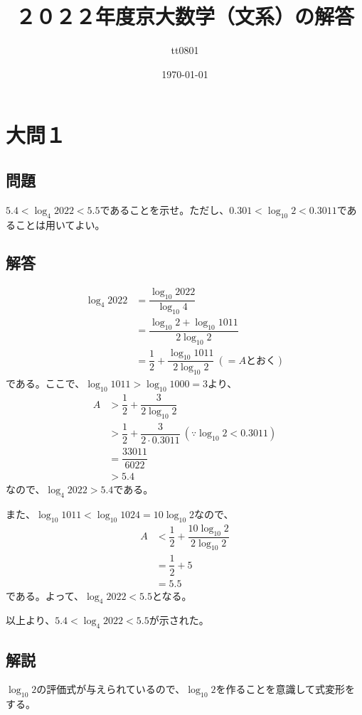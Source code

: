 \documentclass[dvipdfmx,a4paper]{jsarticle}
\title{２０２２年度京大数学（文系）の解答}
\author{tt0801}
\date{\today}
\newcommand{\2}{I\hspace{-1pt}I}
\newcommand{\3}{I\hspace{-1pt}I\hspace{-1pt}I}
\begin{document}
    \maketitle
    \section{大問１}
    \subsection{問題}
    $5.4 < \log_4 2022 < 5.5$であることを示せ。ただし、$0.301 < \log_{10} 2 < 0.3011$であることは用いてよい。


    \subsection{解答}
    \begin{align*}
        \log_4 2022 &= \dfrac{\log_{10} 2022}{\log_{10} 4} \\
            &= \dfrac{\log_{10} 2 + \log_{10} 1011}{2\log_{10} 2} \\
            &= \dfrac{1}{2} + \dfrac{\log_{10} 1011}{2\log_{10} 2} \ (=A \mathrm{とおく})
    \end{align*}
    である。ここで、$\log_{10} 1011 > \log_{10} 1000 = 3$より、
    \begin{align*}
        A & > \dfrac{1}{2} + \dfrac{3}{2\log_{10} 2} \\
        & > \dfrac{1}{2} + \dfrac{3}{2\cdot 0.3011} \ (\because \log_{10} 2 < 0.3011)\\
        &= \dfrac{33011}{6022} \\
        &> 5.4
    \end{align*}
    なので、$\log_4 2022 > 5.4$である。
    
    また、$\log_{10} 1011 < \log_{10} 1024 = 10 \log_{10} 2$なので、
    \begin{align*}
        A & < \dfrac{1}{2} + \dfrac{10 \log_{10} 2}{2\log_{10} 2} \\
        &= \dfrac{1}{2} + 5\\
        &= 5.5
    \end{align*}
    である。よって、$\log_4 2022 < 5.5$となる。

    以上より、$5.4 < \log_4 2022 < 5.5$が示された。


    \subsection{解説}
    $\log_{10} 2$の評価式が与えられているので、$\log_{10} 2$を作ることを意識して式変形をする。
\end{document}
